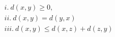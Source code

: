 \documentclass[preview]{standalone}
\begin{document}
\begin{align*}
& i. \ d(x,y) \geq 0,  \\& ii. \  d(x,y)=d(y,x) \\& iii. \ d(x,y) \leq d(x,z) + d(z,y) \\&
\end{align*}
\end{document}
